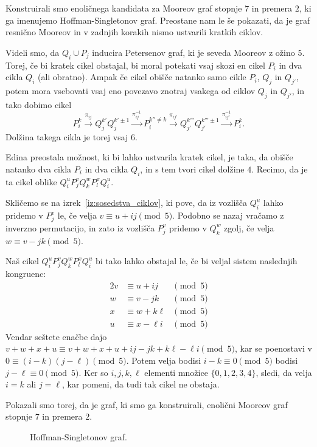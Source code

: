 \documentclass[fin1, tisk]{fmfdelo}
\begin{document}
Konstruirali smo enoličnega kandidata za Mooreov graf stopnje $7$ in premera $2$,
ki ga imenujemo Hoffman-Singletonov graf.
Preostane nam le še pokazati, da je graf resnično Mooreov in v zadnjih korakih nismo ustvarili
kratkih ciklov.

Videli smo, da $Q_i \cup P_j$ inducira Petersenov graf, ki 
je seveda Mooreov z ožino $5$. Torej, če bi kratek
cikel obstajal, bi moral potekati vsaj skozi en cikel $P_i$ in dva cikla $Q_i$ (ali obratno).
Ampak če cikel obišče natanko samo cikle $P_i$, $Q_j$ in $Q_{j'}$, potem 
mora vsebovati vsaj eno povezavo znotraj vsakega od ciklov $Q_j$ in $Q_{j'}$, in tako dobimo cikel
$$P_i^k \overset{\pi_{ij}}{\rightarrow} Q_j^{k'} Q_j^{k'\pm1} \overset{\pi_{ij}^{-1}}{\rightarrow} P_i^{k''\neq k} \overset{\pi_{ij'}}{\rightarrow} Q_{j'}^{k'''} Q_{j'}^{k'''\pm 1} \overset{\pi_{ij'}^{-1}}{\rightarrow} P_i^k.$$
Dolžina takega cikla je torej vsaj $6$.

Edina preostala možnost, ki bi lahko ustvarila kratek cikel, je taka, da obišče natanko dva cikla $P_i$ in dva cikla $Q_i$,
in s tem tvori cikel dolžine $4$. Recimo, da je ta cikel oblike $Q_i^u P_j^v Q_k^w P_l^x Q_i^u$.

Skličemo se na izrek~\ref{iz:sosedstva_ciklov}, ki pove, da iz vozlišča $Q_i^u$ lahko pridemo v $P_j^v$ 
le, če velja $v \equiv u + ij \pmod 5$. Podobno se nazaj vračamo z inverzno permutacijo, in zato
iz vozlišča $P_j^v$ pridemo v $Q_k^w$ zgolj, če velja $w \equiv v - jk \pmod 5$.

Naš cikel $Q_i^u P_j^v Q_k^w P_l^x Q_i^u$ bi tako lahko obstajal le, če bi veljal sistem naslednjih kongruenc:
\begin{alignat}{2}
    v &\equiv u + ij & \pmod 5 \\
    w &\equiv v - jk & \pmod 5 \\
    x &\equiv w + k\ell & \pmod 5 \\
    u &\equiv x - \ell i & \pmod 5
\end{alignat}
Vendar seštete enačbe dajo $v + w + x + u \equiv v + w + x + u + ij - jk + k\ell - \ell i \pmod 5$, 
kar se poenostavi v $0 \equiv (i-k)(j-\ell) \pmod 5$. Potem velja bodisi $i-k \equiv 0 \pmod{5}$
bodisi $j-\ell \equiv 0 \pmod{5}$. Ker so $i, j, k, \ell$ elementi množice $\{0, 1, 2, 3, 4\}$,
sledi, 
da velja $i=k$ ali $j=\ell$, kar pomeni, da tudi tak cikel ne obstaja.

Pokazali smo torej, da je graf, ki smo ga konstruirali, enolični Mooreov graf stopnje $7$ in 
premera $2$.

\begin{figure}[ht]
    \centering
    \def\svgwidth{\columnwidth}
    \caption{Hoffman-Singletonov graf.}
    \label{fig:hoffman_finnished}
\end{figure}
\end{document}
